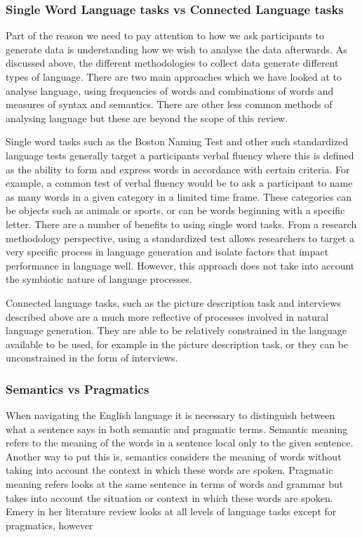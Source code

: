 \documentclass{article}
\begin{document}
\subsubsection{Single Word Language tasks vs Connected Language tasks}
Part of the reason we need to pay attention to how we ask participants to generate data is understanding how we wish to analyse the data afterwards. As discussed above, the different methodologies to collect data generate different types of language. There are two main approaches which we have looked at to analyse language, using frequencies of words and combinations of words and measures of syntax and semantics. There are other less common methods of analysing language but these are beyond the scope of this review. \newline
\par
Single word tasks such as the Boston Naming Test and other such standardized language tests generally target a participants verbal fluency where this is defined as the ability to form and express words in accordance with certain criteria. For example, a common test of verbal fluency would be to ask a participant to name as many words in a given category in a limited time frame. These categories can be objects such as animals or sports, or can be words beginning with a specific letter. There are a number of benefits to using single word tasks. From a research methodology perspective, using a standardized test allows researchers to target a very specific process in language generation and isolate factors that impact performance in language well. However, this approach does not take into account the symbiotic nature of language processes. \newline
\par
Connected language tasks, such as the picture description task and interviews described above are a much more reflective of processes involved in natural language generation. They are able to be relatively constrained in the language available to be used, for example in the picture description task, or they can be unconstrained in the form of interviews. \newline
\par
\subsubsection{Semantics vs Pragmatics}
When navigating the English language it is necessary to distinguish between what a sentence says in both semantic and pragmatic terms. Semantic meaning refers to the meaning of the words in a sentence local only to the given sentence. Another way to put this is, semantics considers the meaning of words without taking into account the context in which these words are spoken. Pragmatic meaning refers looks at the same sentence in terms of words and grammar but takes into account the situation or context in which these words are spoken. Emery in her literature review looks at all levels of language tasks except for pragmatics, however   \newline
\par
\end{document}
